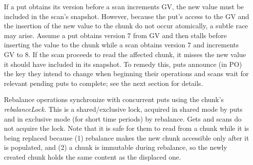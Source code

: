 If a put obtains its version before a scan increments GV, the new value must be included in the scan's snapshot. 
However, because the put's access to the GV and the insertion of the new value to the chunk do not occur atomically,
a subtle race may arise. Assume a put obtains version $7$ from GV and then stalls before
inserting the value to the chunk while a scan obtains version $7$ and increments GV to $8$. If the scan proceeds 
to read the affected chunk, it misses the new value it should have included in its snapshot.
%
To remedy this, puts announce (in PO) the key they intend to change when beginning their operations and scans wait for relevant pending puts to complete; see the next section for details.





Rebalance operations synchronize with concurrent puts using the chunk's \emph{rebalanceLock}.
This is a shared/exclusive lock, acquired in shared mode by puts and in exclusive mode (for short time periods)
by rebalance. 
Gets and scans do not acquire the lock. Note that it is safe for them to read from a chunk while it is being replaced because
(1) rebalance makes the new chunk accessible only after it is populated, and (2) a chunk is immutable during rebalance, so 
the newly created chunk holds the same content as the displaced one.

